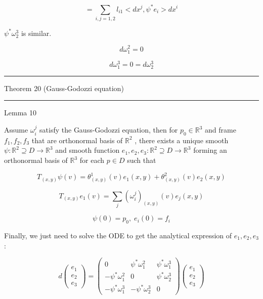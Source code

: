 \documentclass[lang=cn,a4paper,11pt,openany,twoside]{elegantbook}
\newcommand{\HRule}{\begin{center}\rule{0.9\linewidth}{0.2mm}\end{center}}
\begin{document}
\[
= \mathop{\sum }\limits_{{i,j = 1,2}}{l}_{i1} < d{x}^{j},{\psi }^{ * }{e}_{i} > d{x}^{i}
\]

\({\psi }^{ * }{\omega }_{2}^{3}\) is similar.

\[
d{\omega }_{1}^{2} = 0
\]

\[
d{\omega }_{1}^{3} = 0 = d{\omega }_{2}^{3}
\]

\HRule

Theorem 20 (Gauss-Godozzi equation)

\HRule

Lemma 10

Assume \({\omega }_{i}^{j}\) satisfy the Gauss-Godozzi equation, then for \({p}_{0} \in  {\mathbb{R}}^{3}\) and frame \({f}_{1},{f}_{2},{f}_{3}\) that are orthonormal basis of \({\mathbb{R}}^{2}\) , there exists a unique smooth \(\psi  : {\mathbb{R}}^{2} \supseteq  D \rightarrow  {\mathbb{R}}^{3}\) and smooth function \({e}_{1},{e}_{2},{e}_{3} : {\mathbb{R}}^{2} \supseteq  D \rightarrow  {\mathbb{R}}^{3}\) forming an orthonormal basis of \({\mathbb{R}}^{3}\) for each \(p \in  D\) such that

\[
{T}_{\left( x,y\right) }\psi \left( v\right)  = {\theta }_{\left( x,y\right) }^{1}\left( v\right) {e}_{1}\left( {x,y}\right)  + {\theta }_{\left( x,y\right) }^{2}\left( v\right) {e}_{2}\left( {x,y}\right)
\]

\[
{T}_{\left( x,y\right) }{e}_{1}\left( v\right)  = \mathop{\sum }\limits_{j}{\left( {\omega }_{i}^{j}\right) }_{\left( x,y\right) }\left( v\right) {e}_{j}\left( {x,y}\right)
\]

\[
\psi \left( 0\right)  = {p}_{0},\;{e}_{i}\left( 0\right)  = {f}_{i}
\]

Finally, we just need to solve the ODE to get the analytical expression of \({e}_{1},{e}_{2},{e}_{3}\) :

\[
d\left( \begin{array}{l} {e}_{1} \\  {e}_{2} \\  {e}_{3} \end{array}\right)  = \left( \begin{matrix} 0 & {\psi }^{ * }{\omega }_{1}^{2} & {\psi }^{ * }{\omega }_{1}^{3} \\   - {\psi }^{ * }{\omega }_{1}^{2} & 0 & {\psi }^{ * }{\omega }_{2}^{3} \\   - {\psi }^{ * }{\omega }_{1}^{3} &  - {\psi }^{ * }{\omega }_{2}^{3} & 0 \end{matrix}\right) \left( \begin{array}{l} {e}_{1} \\  {e}_{2} \\  {e}_{3} \end{array}\right)
\]
\end{document}
